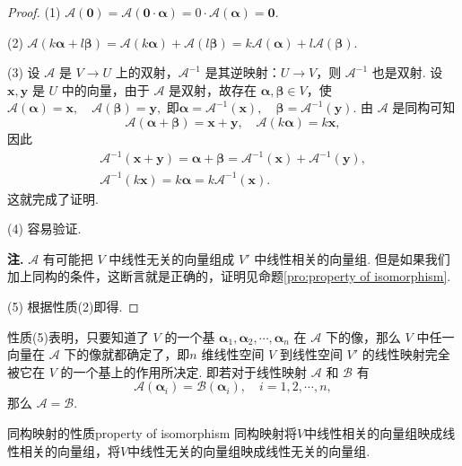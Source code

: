 \documentclass[12pt, a4paper,newtx]{ctexart}
\newenvironment{remark}{\dbend\textbf{注. }}{}{}
\begin{document}
\begin{proof}
	\item[(1)] $\mathcal A(\bm 0) = \mathcal A(\bm 0 \cdot \bm \alpha) = 0 \cdot \mathcal A(\bm\alpha) = \bm 0$.
	\item[(2)] $\mathcal A(k\bm\alpha + l\bm\beta) = \mathcal A(k\bm\alpha) + \mathcal A(l\bm\beta) = k\mathcal A(\bm\alpha) + l\mathcal A(\bm\beta)$.
	\item[(3)] 设 $\mathcal A$ 是 $V \rightarrow U$ 上的双射，$\mathcal A^{-1}$ 是其逆映射：$U \rightarrow V$，则 $\mathcal A^{-1}$ 也是双射. 设 $\bm x, \bm y$ 是 $U$ 中的向量，由于 $\mathcal A$ 是双射，故存在 $\bm\alpha, \bm\beta \in V$，使
	$\mathcal A(\bm\alpha) =\bm x, \quad \mathcal A(\bm\beta) =\bm y,$
	即$\bm\alpha = \mathcal A^{-1}(\bm x), \quad \bm\beta = \mathcal A^{-1}(\bm y).$
	由 $\mathcal A$ 是同构可知
	\[
	\mathcal A(\bm\alpha + \bm\beta) = \bm x +\bm y, \quad \mathcal A(k\bm\alpha) = k\bm x,
	\]
	因此\begin{gather*}
		\mathcal A^{-1}(\bm x +\bm y) = \bm\alpha + \bm\beta = \mathcal A^{-1}(\bm x) + \mathcal A^{-1}(\bm y),\\\mathcal A^{-1}(k\bm x) = k\bm\alpha = k\mathcal A^{-1}(\bm x).
	\end{gather*}
	这就完成了证明. 
	\item[(4)] 容易验证. 
	
\begin{remark}
	$\mathcal{A}$ 有可能把 $V$ 中线性无关的向量组成 $V'$ 中线性相关的向量组. 但是如果我们加上同构的条件，这断言就是正确的，证明见命题\ref{pro:property of isomorphism}.
\end{remark}
	\item[(5)] 根据性质(2)即得. 
\end{proof}
性质(5)表明，只要知道了 $ V $ 的一个基 $\bm\alpha_1, \bm\alpha_2, \cdots, \bm\alpha_n$ 在 $ \mathcal{A} $ 下的像，那么 $ V $ 中任一向量在 $ \mathcal{A} $ 下的像就都确定了，即$ n $ 维线性空间 $ V $ 到线性空间 $ V' $ 的线性映射完全被它在 $ V $ 的一个基上的作用所决定. 即若对于线性映射 $ \mathcal{A} $ 和 $ \mathcal{B} $ 有
\[
\mathcal{A}(\bm\alpha_i) = \mathcal{B}(\bm\alpha_i), \quad i = 1, 2, \cdots, n,
\]
那么 $ \mathcal{A} = \mathcal{B} $. 
\begin{proposition}{同构映射的性质}{property of isomorphism}
	同构映射将$V$中线性相关的向量组映成线性相关的向量组，将$V$中线性无关的向量组映成线性无关的向量组. 
\end{proposition}
\end{document}
